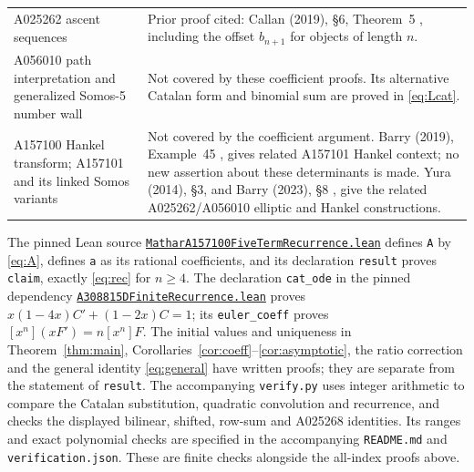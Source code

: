 \documentclass[11pt]{article}
\begin{document}
{\begin{longtable}{@{}p{}p{}@{}}
A025262 ascent sequences & Prior proof cited: Callan (2019),
\S6, Theorem~5 \cite{callan}, including the offset $b_{n+1}$
for objects of length $n$.\\
A056010 path interpretation and generalized Somos-5 number wall &
Not covered by these coefficient proofs. Its alternative Catalan
form and binomial sum are proved in \eqref{eq:Lcat}.\\
A157100 Hankel transform; A157101 and its linked Somos variants &
Not covered by the coefficient argument. Barry (2019), Example~45
\cite{oeish,barry}, gives related A157101 Hankel context; no new assertion
about these determinants is made. Yura (2014), \S3,
and Barry (2023), \S8 \cite{yura,barry2023}, give the related
A025262/A056010 elliptic and Hankel constructions.\\
\bottomrule
\end{longtable}}

The pinned Lean source
\href{https://github.com/the-omega-institute/trureturing/blob/962b1e14510f845c23345d34b4fb8205b2ddc2bd/D5/S1/Recurrence/Algebraic/MatharA157100FiveTermRecurrence.lean}
{\texttt{MatharA157100FiveTermRecurrence.lean}}
defines \texttt{A} by \eqref{eq:A}, defines \texttt{a} as its rational
coefficients, and its declaration \texttt{result} proves
\texttt{claim}, exactly \eqref{eq:rec} for $n\geq4$.
The declaration \texttt{cat\_ode} in the pinned dependency
\href{https://github.com/the-omega-institute/trureturing/blob/962b1e14510f845c23345d34b4fb8205b2ddc2bd/D5/S1/Recurrence/A308815DFiniteRecurrence.lean}
{\texttt{A308815DFiniteRecurrence.lean}}
proves $x(1-4x)C'+(1-2x)C=1$; its \texttt{euler\_coeff}
proves $[x^n](xF')=n[x^n]F$.
The initial values and uniqueness in Theorem~\ref{thm:main},
Corollaries~\ref{cor:coeff}--\ref{cor:asymptotic}, the ratio correction
and the general identity \eqref{eq:general} have written proofs;
they are separate from the statement of \texttt{result}.
The accompanying \texttt{verify.py} uses integer arithmetic to compare
the Catalan substitution, quadratic convolution and recurrence,
and checks the displayed bilinear, shifted, row-sum and A025268 identities.
Its ranges and exact polynomial checks are specified in the accompanying
\texttt{README.md} and \texttt{verification.json}.
These are finite checks alongside the all-index proofs above.
\end{document}
